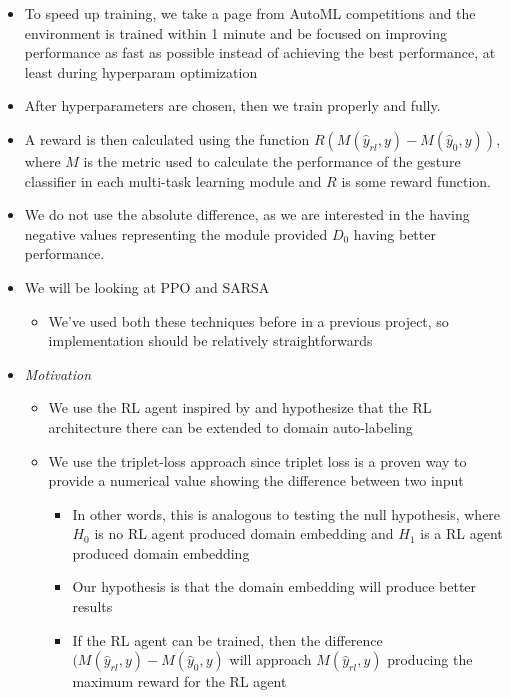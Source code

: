 \begin{itemize}
\begin{itemize}
	\end{itemize}
	\item To speed up training, we take a page from AutoML competitions and the environment is trained within 1 minute and be focused on improving performance as fast as possible instead of achieving the best performance, at least during hyperparam optimization
	\item After hyperparameters are chosen, then we train properly and fully.
	\item A reward is then calculated using the function $R\left(M\left(\hat{y}_{rl}, y\right)-M\left(\hat{y}_{0}, y\right)\right)$, where $M$ is the metric used to calculate the performance of the gesture classifier in each multi-task learning module and $R$ is some reward function.
	\item We do not use the absolute difference, as we are interested in the having negative values representing the module provided $D_0$ having better performance.
	\item We will be looking at PPO \cite{schulman2017proximal} and SARSA \cite{rummery1994line}
	\begin{itemize}
		\item We've used both these techniques before in a previous project, so implementation should be relatively straightforwards
	\end{itemize}
	\item \emph{Motivation}
	\begin{itemize}
		\item We use the RL agent inspired by \cite{ma2021location} and hypothesize that the RL architecture there can be extended to domain auto-labeling
		\item We use the triplet-loss approach since triplet loss is a proven way to provide a numerical value showing the difference between two input
		\begin{itemize}
			\item In other words, this is analogous to testing the null hypothesis, where $H_0$ is no RL agent produced domain embedding and $H_1$ is a RL agent produced domain embedding
			\item Our hypothesis is that the domain embedding will produce better results
			\item If the RL agent can be trained, then the difference $(M\left(\hat{y}_{rl}, y\right)-M\left(\hat{y}_{0}, y\right)$ will approach $M\left(\hat{y}_{rl}, y\right)$ producing the maximum reward for the RL agent
		\end{itemize}
	\end{itemize}
\end{itemize}

